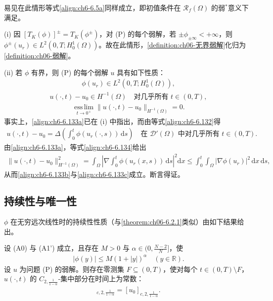 \documentclass[../../main.tex]{subfiles}%
\begin{document}
易见在此情形等式\eqref{align:ch6-6.5a}同样成立，即初值条件在 $\mathscr{R}_f(\Omega)$ 的弱$^*$意义下满足。

\begin{remark}\label{remark:ch06-6.7.1}
(i) 因 $[T_K(\phi)]^\pm=T_K(\phi^\pm)$，对 (P) 的每个弱解，若 $\pm\phi_{\pm\infty}<+\infty$，则 $\phi^\pm(u_r)\in L^2(0,T;H^1_0(\Omega))$。故在此情形，\cref{definition:ch06-无界弱解}化归为\cref{definition:ch06-弱解}。

(ii) 若 $\phi$ 有界，则 (P) 的每个弱解 $u$ 具有如下性质：
\begin{align}
\phi(u_r)\in L^2(0,T;H^1_0(\Omega)), \label{align:ch6-6.133a}
\end{align}
\begin{align}
u(\cdot,t)-u_0\in H^{-1}(\Omega) \quad\text{对几乎所有 }t\in(0,T), \label{align:ch6-6.133b}
\end{align}
\begin{align}
\operatorname*{ess\,lim}_{t\to0^+}\|u(\cdot,t)-u_0\|_{H^{-1}(\Omega)}=0. \label{align:ch6-6.133c}
\end{align}
事实上，\eqref{align:ch6-6.133a}已在 (i) 中指出，而由等式\eqref{align:ch6-6.132}得
\begin{align}
u(\cdot,t)-u_0=\Delta\left(\int_0^t\phi(u_r(\cdot,s))\,\mathrm{d}s\right)
\quad\text{在 }\mathscr{D}'(\Omega)\text{ 中对几乎所有 }t\in(0,T). \label{align:ch6-6.134}
\end{align}
由\eqref{align:ch6-6.133a}，等式\eqref{align:ch6-6.134}给出
\begin{align*}
\|u(\cdot,t)-u_0\|^2_{H^{-1}(\Omega)}
=\int_\Omega\left|\nabla\int_0^t\phi(u_r(x,s))\,\mathrm{d}s\right|^2\mathrm{d}x
\leqslant\int_0^t\int_\Omega|\nabla\phi(u_r)|^2\,\mathrm{d}x\,\mathrm{d}s,
\end{align*}
从而\eqref{align:ch6-6.133b}与\eqref{align:ch6-6.133c}成立。断言得证。
\end{remark}

\subsection{持续性与唯一性}\label{subsection:ch06-无界持续唯一}

$\phi$ 在无穷远次线性时的持续性性质（与\cref{theorem:ch06-6.2.1}类似）由如下结果给出。

\begin{theorem}\label{theorem:ch6-正则化}
设 (A0) 与 (A1') 成立，且存在 $M>0$ 与 $\alpha\in(0,\frac{N-2}{N}]$，使
\begin{align*}
|\phi(y)|\leqslant M(1+|y|)^\alpha \quad(y\in\mathbb{R}).
\end{align*}
设 $u$ 为问题 (P) 的弱解。则存在零测集 $F\subseteq(0,T)$，使对每个 $t\in(0,T)\setminus F$，$u(\cdot,t)$ 的 $C_{2,\frac{1}{1-\alpha}}$-集中部分在时间上为常数：
\begin{align}
[u(\cdot,t)]_{c,2,\frac{1}{1-\alpha}}=[u_0]_{c,2,\frac{1}{1-\alpha}}. \label{align:ch6-6.135}
\end{align}
\end{theorem}
\end{document}
